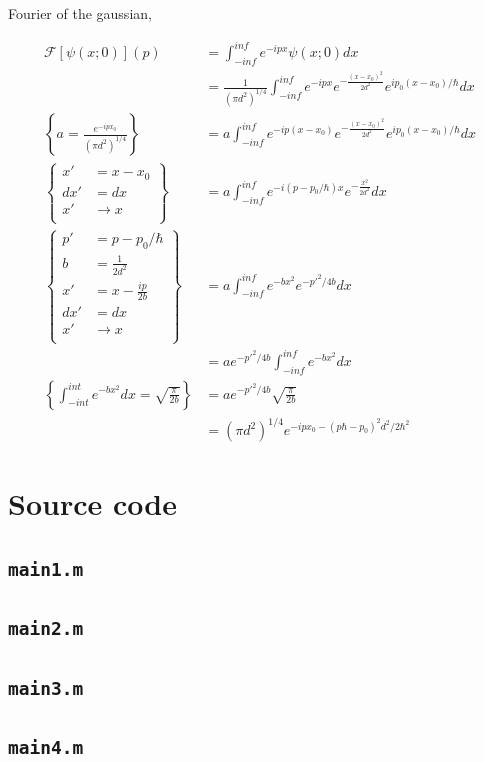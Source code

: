 Fourier of the gaussian,

\begin{align}
	\mathcal{F}\left[\psi(x;0)\right](p) 							& =  \int_{-inf}^{inf} e^{-ipx} \psi(x;0) dx \\
 																	& = \frac{1}{(\pi d^2)^{1/4}}\int_{-inf}^{inf}e^{-ipx}e^{-\frac{(x-x_0)^2}{2d^2}} e^{ip_0(x-x_0)/\hbar}dx\\
\left\{a=\frac{e^{-ipx_0}}{(\pi d^2)^{1/4}}\right\}					& = a \int_{-inf}^{inf}e^{-ip(x-x_0)}e^{-\frac{(x-x_0)^2}{2d^2}}e^{ip_0(x-x_0)/\hbar} dx\\
\left\{
\begin{array}{ll}
x'	& = x-x_0\\
dx' & = dx   \\
x'	& \rightarrow x\\
\end{array}
\right\} 															& = a\int_{-inf}^{inf}e^{-i(p-p_0/\hbar)x}e^{-\frac{x^2}{2d^2}}dx \\
\left\{
\begin{array}{ll}
p'		& = p-p_0/\hbar\\
b		& = \frac{1}{2d^2}   \\
x'		& = x-\frac{ip}{2b}\\
dx'		& = dx\\
x'		& \rightarrow x\\
\end{array}
\right\}															& = a\int_{-inf}^{inf}e^{-bx^2}e^{-p'^2/4b} dx\\
																	& = ae^{-p'^2/4b}\int_{-inf}^{inf}e^{-bx^2} dx\\
\left\{\int_{-int}^{int}e^{-bx^2}dx=\sqrt{\frac{\pi}{2b}}\right\}	& = ae^{-p'^2/4b}\sqrt{\frac{\pi}{2b}}\\
																	& = (\pi d^2)^{1/4}e^{-ipx_0-(p\hbar-p_0)^2d^2/2\hbar^2}
\end{align}





\appendix
\section{Source code}

\subsection{\texttt{main1.m}}


\subsection{\texttt{main2.m}}


\subsection{\texttt{main3.m}}


\subsection{\texttt{main4.m}}



